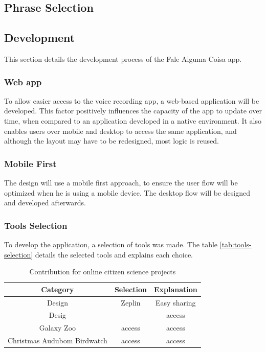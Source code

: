 \clearpage
\subsection{Phrase Selection}
\label{sec:app-phrase-selection}

\subsection{Development}
\label{sec:app-development}

This section details the development process of the Fale Alguma Coisa app.

\subsubsection{Web app}

To allow easier access to the voice recording app, a web-based application will be developed. This factor positively influences the capacity of the app to update over time, when compared to an application developed in a native environment. It also enables users over mobile and desktop to access the same application, and although the layout may have to be redesigned, most logic is reused.

\subsubsection{Mobile First}

The design will use a mobile first approach, to ensure the user flow will be optimized when he is using a mobile device. The desktop flow will be designed and developed afterwards.

\subsubsection{Tools Selection}

To develop the application, a selection of tools was made. The table \ref{tab:tools-selection} details the selected tools and explains each choice.

\begin{table}[h]
    \centering
    \begin{tabular}{|c|c|c|}
        \hline Category & Selection & Explanation \\
        \hline Design & Zeplin & Easy sharing  \\ 
        \hline Desig &  & access \\ 
        \hline Galaxy Zoo & access & access \\ 
        \hline Christmas Audubom Birdwatch & access & access \\ \hline 
    \end{tabular}
    \caption{Contribution for online citizen science projects}
    \label{tab:cs-contributions}
\end{table}


